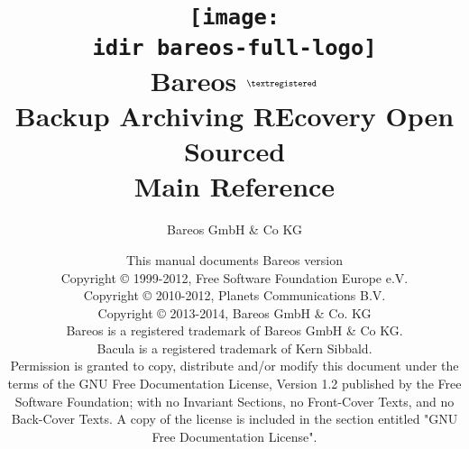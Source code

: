 
\begin{titlepage}

\title{\texttt{[image: \\idir bareos-full-logo]} \\
\Huge{Bareos} $^{\normalsize \textregistered}$\\
\huge{Backup Archiving REcovery Open Sourced}\\[2ex]
Main Reference\\
}

\author{Bareos GmbH \& Co KG}
\date{This manual documents Bareos version \version \\
      \vspace{0.2in}
      Copyright {\copyright} 1999-2012, Free Software Foundation Europe e.V. \\
      Copyright {\copyright} 2010-2012, Planets Communications B.V. \\
      Copyright {\copyright} 2013-2014, Bareos GmbH \& Co. KG \\
      Bareos {\textregistered} is a registered trademark of Bareos GmbH \& Co KG.\\
      Bacula {\textregistered} is a registered trademark of Kern Sibbald.\\
      \vspace{0.2in}
  Permission is granted to copy, distribute and/or modify this document under the terms of the
  GNU Free Documentation License, Version 1.2 published by the Free Software Foundation;
  with no Invariant Sections, no Front-Cover Texts, and no Back-Cover Texts.
  A copy of the license is included in the section entitled "GNU Free Documentation License".
}

\maketitle

\end{titlepage}
